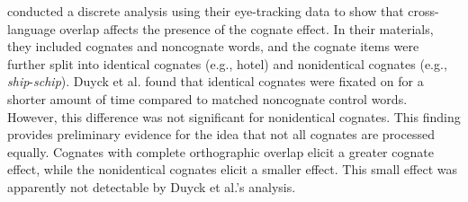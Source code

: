 \textcite{Duyck2007} conducted a discrete analysis using their eye-tracking data  to show that cross-language overlap affects the presence of the cognate effect. In their materials, they included cognates and noncognate words, and the cognate items were further split into identical cognates (e.g., hotel) and nonidentical cognates (e.g., \textit{ship}-\textit{schip}). Duyck et al. found that identical cognates were fixated on for a shorter amount of time compared to matched noncognate control words. However, this difference was not significant for nonidentical cognates. This finding provides preliminary evidence for the idea that not all cognates are processed equally. Cognates with complete orthographic overlap elicit a greater cognate effect, while the nonidentical cognates elicit a smaller effect. This small effect was apparently not detectable by Duyck et al.'s analysis.  



